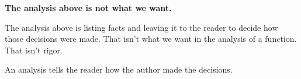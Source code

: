 \documentclass{ximera}
\begin{document}
\begin{center}
\textbf{\textcolor{red!70!black}{The analysis above is not what we want.}}  
\end{center}


The analysis above is listing facts and leaving it to the reader to decide how those decisions were made.  That isn't what we want in the analysis of a function. That isn't rigor. 


An analysis tells the reader how the author made the decisions.
\end{document}
